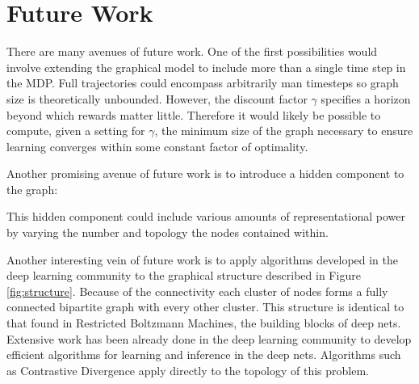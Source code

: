 \documentclass{article} %
\begin{document}
\section{Future Work}
There are many avenues of future work. One of the first possibilities would involve extending the graphical model to include more than a single time step in the MDP. Full trajectories could encompass arbitrarily man timesteps so graph size is theoretically unbounded. However, the discount factor $\gamma$ specifies a horizon beyond which rewards matter little. Therefore it would likely be possible to compute, given a setting for $\gamma$, the minimum size of the graph necessary to ensure learning converges within some constant factor of optimality. 

Another promising avenue of future work is to introduce a hidden component to the graph:


This hidden component could include various amounts of representational power by varying the number and topology the nodes contained within. 

Another interesting vein of future work is to apply algorithms developed in the deep learning community to the graphical structure described in Figure \ref{fig:structure}. Because of the connectivity each cluster of nodes forms a fully connected bipartite graph with every other cluster. This structure is identical to that found in Restricted Boltzmann Machines, the building blocks of deep nets. Extensive work has been already done in the deep learning community to develop efficient algorithms for learning and inference in the deep nets. Algorithms such as Contrastive Divergence \cite{hinton02} apply directly to the topology of this problem. 
\end{document}
